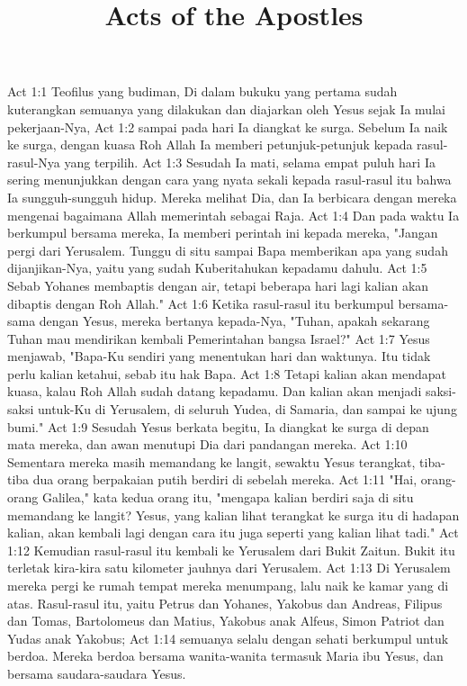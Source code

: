 

\title{Acts of the Apostles}

Act 1:1  Teofilus yang budiman, Di dalam bukuku yang pertama sudah kuterangkan semuanya yang dilakukan dan diajarkan oleh Yesus sejak Ia mulai pekerjaan-Nya,
Act 1:2  sampai pada hari Ia diangkat ke surga. Sebelum Ia naik ke surga, dengan kuasa Roh Allah Ia memberi petunjuk-petunjuk kepada rasul-rasul-Nya yang terpilih.
Act 1:3  Sesudah Ia mati, selama empat puluh hari Ia sering menunjukkan dengan cara yang nyata sekali kepada rasul-rasul itu bahwa Ia sungguh-sungguh hidup. Mereka melihat Dia, dan Ia berbicara dengan mereka mengenai bagaimana Allah memerintah sebagai Raja.
Act 1:4  Dan pada waktu Ia berkumpul bersama mereka, Ia memberi perintah ini kepada mereka, "Jangan pergi dari Yerusalem. Tunggu di situ sampai Bapa memberikan apa yang sudah dijanjikan-Nya, yaitu yang sudah Kuberitahukan kepadamu dahulu.
Act 1:5  Sebab Yohanes membaptis dengan air, tetapi beberapa hari lagi kalian akan dibaptis dengan Roh Allah."
Act 1:6  Ketika rasul-rasul itu berkumpul bersama-sama dengan Yesus, mereka bertanya kepada-Nya, "Tuhan, apakah sekarang Tuhan mau mendirikan kembali Pemerintahan bangsa Israel?"
Act 1:7  Yesus menjawab, "Bapa-Ku sendiri yang menentukan hari dan waktunya. Itu tidak perlu kalian ketahui, sebab itu hak Bapa.
Act 1:8  Tetapi kalian akan mendapat kuasa, kalau Roh Allah sudah datang kepadamu. Dan kalian akan menjadi saksi-saksi untuk-Ku di Yerusalem, di seluruh Yudea, di Samaria, dan sampai ke ujung bumi."
Act 1:9  Sesudah Yesus berkata begitu, Ia diangkat ke surga di depan mata mereka, dan awan menutupi Dia dari pandangan mereka.
Act 1:10  Sementara mereka masih memandang ke langit, sewaktu Yesus terangkat, tiba-tiba dua orang berpakaian putih berdiri di sebelah mereka.
Act 1:11  "Hai, orang-orang Galilea," kata kedua orang itu, "mengapa kalian berdiri saja di situ memandang ke langit? Yesus, yang kalian lihat terangkat ke surga itu di hadapan kalian, akan kembali lagi dengan cara itu juga seperti yang kalian lihat tadi."
Act 1:12  Kemudian rasul-rasul itu kembali ke Yerusalem dari Bukit Zaitun. Bukit itu terletak kira-kira satu kilometer jauhnya dari Yerusalem.
Act 1:13  Di Yerusalem mereka pergi ke rumah tempat mereka menumpang, lalu naik ke kamar yang di atas. Rasul-rasul itu, yaitu Petrus dan Yohanes, Yakobus dan Andreas, Filipus dan Tomas, Bartolomeus dan Matius, Yakobus anak Alfeus, Simon Patriot dan Yudas anak Yakobus;
Act 1:14  semuanya selalu dengan sehati berkumpul untuk berdoa. Mereka berdoa bersama wanita-wanita termasuk Maria ibu Yesus, dan bersama saudara-saudara Yesus.
